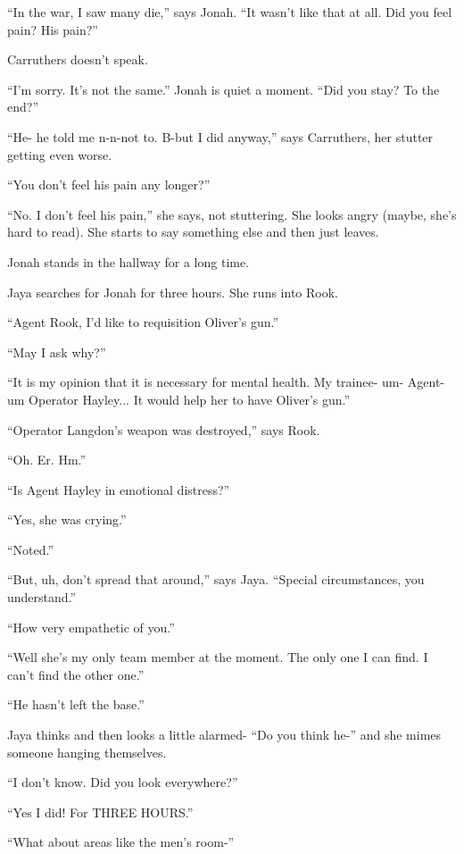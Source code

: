 ``In the war, I saw many die,'' says Jonah.  ``It wasn't like that at all.  Did you feel pain? His pain?''

Carruthers doesn't speak.

``I'm sorry.  It's not the same.''  Jonah is quiet a moment.  ``Did you stay?  To the end?''

``He- he told me n-n-not to.  B-but I did anyway,'' says Carruthers, her stutter getting even worse.

``You don't feel his pain any longer?''

``No.  I don't feel his pain,'' she says, not stuttering.  She looks angry (maybe, she's hard to read).  She starts to say something else and then just leaves.

Jonah stands in the hallway for a long time.





Jaya searches for Jonah for three hours.  She runs into Rook.

``Agent Rook, I'd like to requisition Oliver's gun.''

``May I ask why?''

``It is my opinion that it is necessary for mental health.  My trainee- um- Agent- um Operator Hayley... It would help her to have Oliver's gun.''

``Operator Langdon's weapon was destroyed,'' says Rook.

``Oh.  Er.  Hm.''

``Is Agent Hayley in emotional distress?''

``Yes, she was crying.''

``Noted.''

``But, uh, don't spread that around,'' says Jaya.  ``Special circumstances, you understand.''

``How very empathetic of you.''

``Well she's my only team member at the moment.  The only one I can find.  I can't find the other one.''

``He hasn't left the base.''

Jaya thinks and then looks a little alarmed- ``Do you think he-'' and she mimes someone hanging themselves.

``I don't know.  Did you look everywhere?''

``Yes I did!  For THREE HOURS.''

``What about areas like the men's room-''

